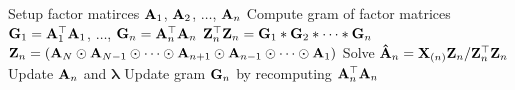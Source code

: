\begin{algorithmic}[1]\footnotesize
    
      \State Setup factor matirces  $\mathbf{A}_1$, $\mathbf{A}_2$, $\dots$, $\mathbf{A}_n$
      \State Compute gram of factor matrices $\mathbf{G}_1 = \mathbf{A}_1^\top \mathbf{A}_1$, $\dots$, $\mathbf{G}_n = \mathbf{A}_n^\top \mathbf{A}_n$  
      \State $\mathbf{Z}_n^\top\mathbf{Z}_n = \mathbf{G}_1 \ast \mathbf{G}_2 \ast \dots \ast \mathbf{G}_n$
      \State $\mathbf{Z}_n =  (\mathbf{A}_N \odot \mathbf{A}_{N-1} \odot \dots \odot \mathbf{A}_{n+1} \odot \mathbf{A}_{n-1} \odot \dots \odot \mathbf{A}_1)$
      \State Solve $\mathbf{\hat{A}}_n = \mathbf{X}_{(n)}\mathbf{Z}_n / \mathbf{Z}_n^\top\mathbf{Z}_n$
      \State Update $\mathbf{A}_n$ and $\bm{\lambda}$
      \State Update gram $\mathbf{G}_n$ by recomputing $\mathbf{A}_n^\top\mathbf{A}_n$
      
      \EndFor
      \EndWhile
    \EndFunction
    
  \end{algorithmic}